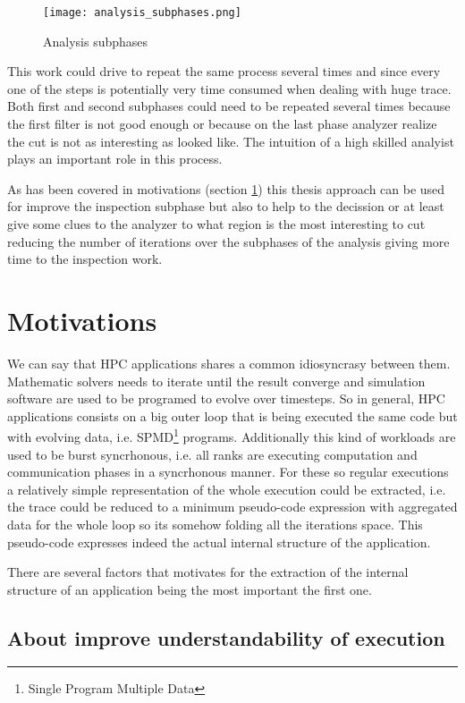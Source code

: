 \begin{figure}[]
  \centering
  \texttt{[image: analysis\_subphases.png]}
  \caption{Analysis subphases}
  \label{fig:analysis_subphases}
\end{figure}

This work could drive to repeat the same process several times and since every 
one of the steps is potentially very time consumed when dealing with huge trace. 
Both first and second subphases could need to be repeated several times because 
the first filter is not good enough or because on the last phase analyzer realize 
the cut is not as interesting as looked like. The intuition of a high skilled
analyist plays an important role in this process.

As has been covered in motivations (section \ref{s:motivations}) this thesis
approach can be used for improve the inspection subphase but also to help to the
decission or at least give some clues to the analyzer to what region is the most
interesting to cut reducing the number of iterations over the subphases of the
analysis giving more time to the inspection work.

\section{Motivations}\label{s:motivations}

We can say that HPC applications shares a common idiosyncrasy between them. 
Mathematic solvers needs to iterate until the result converge and 
simulation software are used to be programed to evolve over timesteps. So in 
general, HPC applications consists on a big outer loop that is being executed the 
same code but with evolving data, i.e. SPMD\footnote{Single
Program Multiple Data} programs. Additionally this kind of workloads are used
to be burst syncrhonous, i.e. all ranks are executing computation and
communication phases in a syncrhonous manner. For these so regular executions a
relatively simple representation of the whole execution could be extracted, i.e.
the trace could be reduced to a minimum pseudo-code expression
with aggregated data for the whole loop so its somehow folding all the iterations
space. This pseudo-code expresses indeed the actual internal structure of the 
application.

There are several factors that motivates for the extraction of the internal
structure of an application being the most important the first one.


\subsection{About improve understandability of execution}

